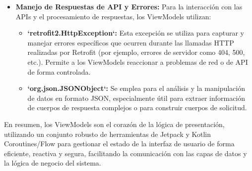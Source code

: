 \begin{itemize}
	\item \textbf{Manejo de Respuestas de API y Errores:}
	Para la interacción con las APIs y el procesamiento de respuestas, los ViewModels utilizan:
	\begin{itemize}
		\item \textbf{`retrofit2.HttpException`:} Esta excepción se utiliza para capturar y manejar errores específicos que ocurren durante las llamadas HTTP realizadas por Retrofit (por ejemplo, errores de servidor como 404, 500, etc.). Permite a los ViewModels reaccionar a problemas de red o de API de forma controlada.
		\item \textbf{`org.json.JSONObject`:} Se emplea para el análisis y la manipulación de datos en formato JSON, especialmente útil para extraer información de cuerpos de respuesta complejos o para construir cuerpos de solicitud.
	\end{itemize}
\end{itemize}

En resumen, los ViewModels son el corazón de la lógica de presentación, utilizando un conjunto robusto de herramientas de Jetpack y Kotlin Coroutines/Flow para gestionar el estado de la interfaz de usuario de forma eficiente, reactiva y segura, facilitando la comunicación con las capas de datos y la lógica de negocio del sistema.

%
%
